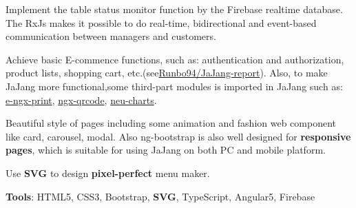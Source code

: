 \documentclass[letterpaper]{deedy-resume} %
\begin{document}
\begin{minipage}[t]{0.33\textwidth} %


\end{minipage} %
\begin{minipage}[t]{1\textwidth} %


\begin{tightitemize}
	\item Implement the table status monitor function by the Firebase realtime database. The RxJs makes it possible to do real-time, bidirectional and event-based communication between managers and customers.
	\item Achieve basic E-commence functions, such as: authentication and authorization, product lists, shopping cart, etc.(see\href{https://github.com/Runbo94/JaJang-report}{Runbo94/JaJang-report}). Also, to make JaJang more functional,some third-part modules is imported in JaJang such as: \href{https://github.com/laixiangran/e-ngx-print}{e-ngx-print}, \href{https://github.com/nacardin/ngx-qrcode}{ngx-qrcode},
	\href{https://www.npmjs.com/package/neu-charts}{neu-charts}.
	\item  Beautiful style of pages including some animation and fashion web component like card, carousel, modal. Also ng-bootstrap is also well designed for \textbf{responsive pages}, which is suitable for using JaJang on both PC and mobile platform.
	\item Use \textbf{SVG} to design \textbf{pixel-perfect} menu maker.
	\item \textbf{Tools}: HTML5, CSS3, Bootstrap, \textbf{SVG}, TypeScript, Angular5, Firebase
\end{tightitemize}
\sectionspace %


\end{minipage}
\end{document}
